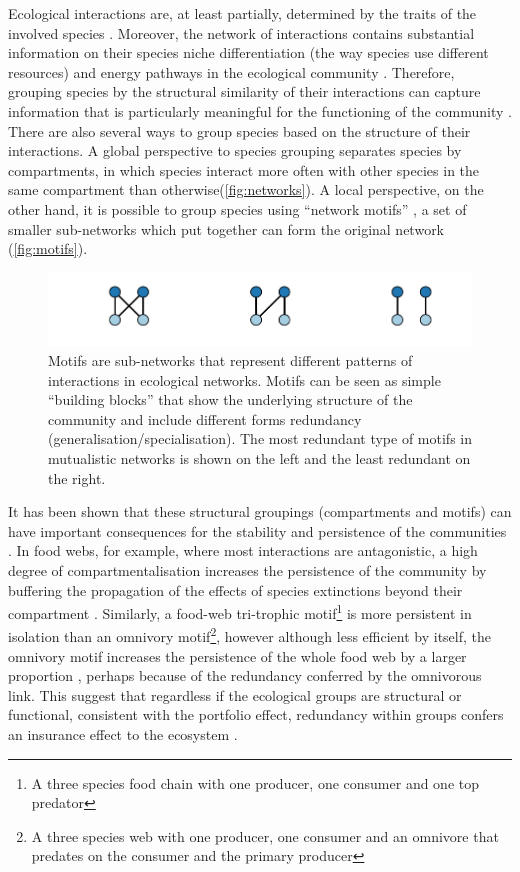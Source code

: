 \documentclass[a4paper]{article}
\begin{document}
Ecological interactions are, at least partially, determined by the traits of the involved species \autocite{Cohen1993, Stang2009, Edwards2011}.
Moreover, the network of interactions contains substantial information on their species niche differentiation (the way species use different resources) and energy pathways in the ecological community \autocite{Gauzens2014}.
Therefore, grouping species by the structural similarity of their interactions can capture information that is particularly meaningful for the functioning of the community \autocite{Thebault2010, Stouffer2011}.
There are also several ways to group species based on the structure of their interactions.
A global perspective to species grouping separates species by compartments, in which species interact more often with other species in the same compartment than otherwise(\autoref{fig:networks}).
A local perspective, on the other hand, it is possible to group species using ``network motifs'' \autocite{Holt2001, Milo2002, Stouffer2007a}, a set of smaller sub-networks which put together can form the original network (\autoref{fig:motifs}).

\begin{figure}[bp]
  \centering
  \includegraphics{motifs}
  \caption{
  \label{fig:motifs}
  Motifs are sub-networks that represent different patterns of interactions in ecological networks.
  Motifs can be seen as simple “building blocks” that show the underlying structure of the community and include different forms redundancy (generalisation/specialisation).
  The most redundant type of motifs in mutualistic networks is shown on the left and the least redundant on the right.
  }
\end{figure}

It has been shown that these structural groupings (compartments and motifs) can have important consequences for the stability and persistence of the communities \autocite{Neutel2002, Kondoh2008, Thebault2010, Stouffer2010, Stouffer2011}.
In food webs, for example, where most interactions are antagonistic, a high degree of compartmentalisation increases the persistence of the community by buffering the propagation of the effects of species extinctions beyond their compartment \autocite{Stouffer2011}.
Similarly, a food-web tri-trophic motif\footnote{A three species food chain with one producer, one consumer and one top predator} is more persistent in isolation than an omnivory motif\footnote{A three species web with one producer, one consumer and an omnivore that predates on the consumer and the primary producer}, however although less efficient by itself, the omnivory motif increases the persistence of the whole food web by a larger proportion \autocite{Stouffer2010}, perhaps because of the redundancy conferred by the omnivorous link.
This suggest that regardless if the ecological groups are structural or functional, consistent with the portfolio effect, redundancy within groups confers an insurance effect to the ecosystem \autocite{Walker1992}.
\end{document}
